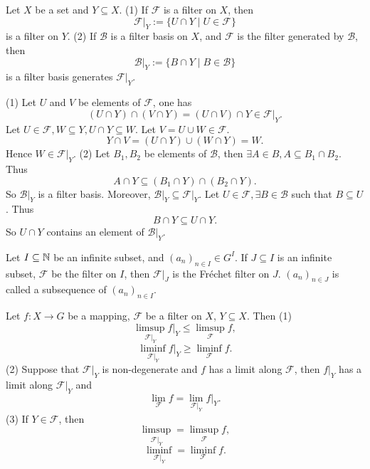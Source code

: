 \begin{propositionenv}
    Let $X$ be a set and $Y\subseteq X$.\newline
    (1) If $\mathcal{F}$ is a filter on $X$, then 
    $$\left.\mathcal{F}\right|_Y:=\{U\cap Y\mid U\in \mathcal{F}\}$$
    is a filter on $Y$.
    \newline
    (2) If $\mathcal{B}$ is a filter basis on $X$, and $\mathcal{F}$ is the filter generated by $\mathcal{B}$, then 
    $$\left.\mathcal{B}\right|_Y:=\{B\cap Y\mid B\in \mathcal{B}\}$$
    is a filter basis generates $\left.\mathcal{F}\right|_Y$.
\end{propositionenv}
\begin{proofenv}
    \quad 
    \newline
    (1) Let $U$ and $V$ be elements of $\mathcal{ F}$, one has 
    $$(U\cap Y)\cap (V\cap Y)=(U\cap V)\cap Y\in \left.\mathcal{F}\right|_Y.$$
    Let $U\in \mathcal{F}, W\subseteq Y,U\cap Y\subseteq W$. Let $V=U\cup W\in \mathcal{F}$.
    $$Y\cap V=(U\cap Y)\cup(W\cap Y)=W.$$
    Hence $W\in \left.\mathcal{F}\right|_Y.$
    \newline
    (2) Let $B_1,B_2$ be elements of $\mathcal{B}$, then $\exists A\in B, A\subseteq B_1\cap B_2.$ Thus 
    $$A\cap Y\subseteq(B_1\cap Y)\cap (B_2\cap Y).$$
    So $\left.\mathcal{ B}\right|_Y$ is a filter basis. Moreover, $\left.\mathcal{B}\right|_Y\subseteq\left.\mathcal{F}\right|_Y$. Let $U\in \mathcal{F}, \exists B\in \mathcal{B}$ such that $B\subseteq U$. Thus 
    $$B\cap Y\subseteq U\cap Y.$$
    So $U\cap Y$  contains an element of $\left.\mathcal{B}\right|_Y$.
\end{proofenv}
\begin{exampleenv}
    Let $I\subseteq \mathbb{N}$ be an infinite subset, and $(a_n)_{n\in I}\in G^I$. If $J\subseteq I$ is an infinite subset, $\mathcal{F}$ be the filter on $I$, then $\mathcal{F}|_J$ is the Fréchet filter on $J$. $(a_n)_{n\in J}$ is called a subsequence of $(a_n)_{n\in I}$.
\end{exampleenv}
\begin{propositionenv}
    Let $f:X\longrightarrow G$ be a mapping, $\mathcal{F}$ be a filter on $X$, $Y\subseteq X$. Then 
    \newline
    (1) 
    $$\limsup_{\mathcal{F}|_Y}f|_Y\le \limsup_{\mathcal{F}}f,$$
    $$\liminf_{\mathcal{F}|_Y}f|_Y\ge \liminf_{\mathcal{F}}f.$$
    (2) Suppose that $\mathcal{F}|_Y$ is non-degenerate and $f$ has a limit along $\mathcal{F}$, then $f|_Y$ has a limit along $\mathcal{F}|_Y$ and 
    $$\lim_{\mathcal{F}}f=\lim_{\mathcal{F}|_Y}f|_Y.$$
    (3) If $Y\in \mathcal{F}$, then 
    $$\limsup_{\mathcal{F}|_Y}=\limsup_{\mathcal{F}}f,$$
    $$\liminf_{\mathcal{F}|_Y}=\liminf_{\mathcal{F}}f.$$
\end{propositionenv}

